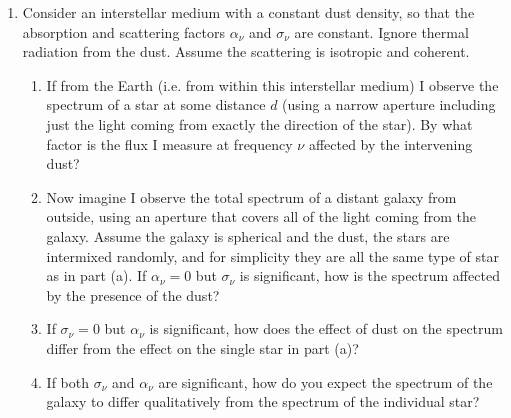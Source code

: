 \documentclass[11pt, preprint]{article}
\begin{document}
\begin{enumerate}
\item Consider an interstellar medium with a constant dust density, so
  that the absorption and scattering factors $\alpha_\nu$ and
  $\sigma_\nu$ are constant. Ignore thermal radiation from the
  dust. Assume the scattering is isotropic and coherent.
  \begin{enumerate}
    \item If from the Earth (i.e. from within this interstellar
      medium) I observe the spectrum of a star at some distance $d$
      (using a narrow aperture including just the light coming from
      exactly the direction of the star). By what factor is the flux I
      measure at frequency $\nu$ affected by the intervening dust?
    \item Now imagine I observe the total spectrum of a distant galaxy
      from outside, using an aperture that covers all of the light
      coming from the galaxy. Assume the galaxy is spherical and the
      dust, the stars are intermixed randomly, and for simplicity they
      are all the same type of star as in part (a).  If $\alpha_\nu =
      0$ but $\sigma_\nu$ is significant, how is the spectrum affected
      by the presence of the dust?
    \item If $\sigma_\nu = 0$ but $\alpha_\nu$ is significant, how
      does the effect of dust on the spectrum differ from the effect
      on the single star in part (a)?
    \item If both $\sigma_\nu$ and $\alpha_\nu$ are significant, how
      do you expect the spectrum of the galaxy to differ qualitatively
      from the spectrum of the individual star?
  \end{enumerate}
  
\end{enumerate}
\end{document}
